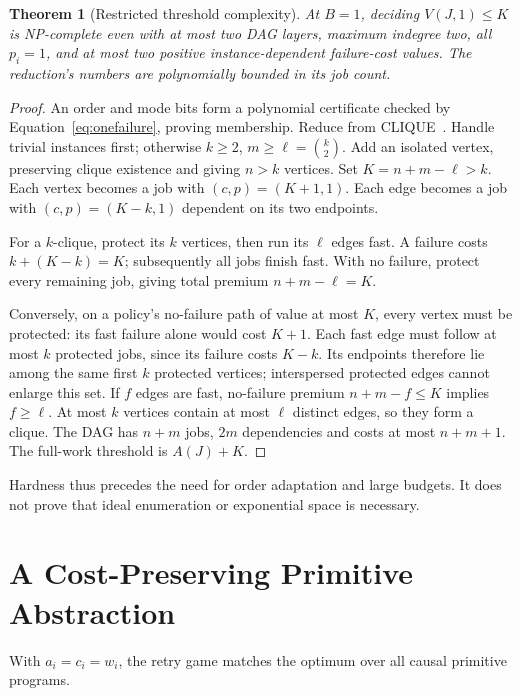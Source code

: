 \documentclass[acmsmall,screen,review,anonymous]{acmart}
\newtheorem{theorem}{Theorem}
\begin{document}
\begin{theorem}[Restricted threshold complexity]
\label{thm:hardness}
At $B=1$, deciding $V(J,1)\le K$ is NP-complete even with at most two DAG layers, maximum indegree two, all $p_i=1$, and at most two positive instance-dependent failure-cost values. The reduction's numbers are polynomially bounded in its job count.
\end{theorem}
\begin{proof}
An order and mode bits form a polynomial certificate checked by Equation~\eqref{eq:onefailure}, proving membership. Reduce from CLIQUE~\cite{karp}. Handle trivial instances first; otherwise $k\ge2$, $m\ge\ell=\binom{k}{2}$. Add an isolated vertex, preserving clique existence and giving $n>k$ vertices. Set $K=n+m-\ell>k$. Each vertex becomes a job with $(c,p)=(K+1,1)$. Each edge becomes a job with $(c,p)=(K-k,1)$ dependent on its two endpoints.

For a $k$-clique, protect its $k$ vertices, then run its $\ell$ edges fast. A failure costs $k+(K-k)=K$; subsequently all jobs finish fast. With no failure, protect every remaining job, giving total premium $n+m-\ell=K$.

Conversely, on a policy's no-failure path of value at most $K$, every vertex must be protected: its fast failure alone would cost $K+1$. Each fast edge must follow at most $k$ protected jobs, since its failure costs $K-k$. Its endpoints therefore lie among the same first $k$ protected vertices; interspersed protected edges cannot enlarge this set. If $f$ edges are fast, no-failure premium $n+m-f\le K$ implies $f\ge\ell$. At most $k$ vertices contain at most $\ell$ distinct edges, so they form a clique. The DAG has $n+m$ jobs, $2m$ dependencies and costs at most $n+m+1$. The full-work threshold is $A(J)+K$.
\end{proof}

Hardness thus precedes the need for order adaptation and large budgets. It does not prove that ideal enumeration or exponential space is necessary.

\section{A Cost-Preserving Primitive Abstraction}
\label{sec:abstraction}

With $a_i=c_i=w_i$, the retry game matches the optimum over all causal primitive programs.
\end{document}
